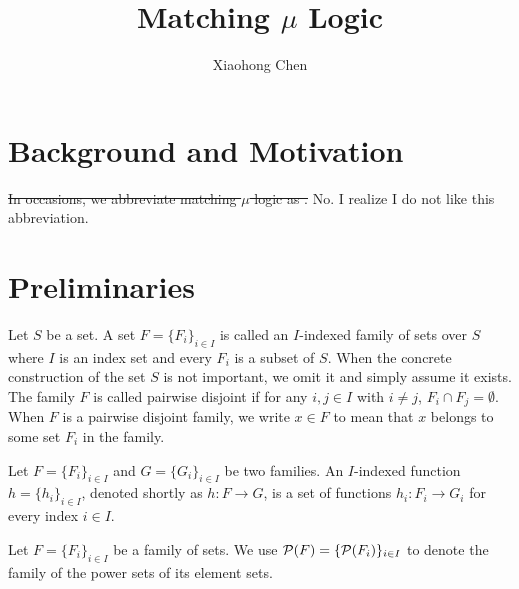\documentclass{amsart}
\title{Matching $\mu$ Logic}
\author{Xiaohong Chen}
\begin{document}
\maketitle


\section{Background and Motivation}
\sout{
In occasions, we abbreviate matching $\mu$ logic as \MmL.
}
No. I realize I do not like this abbreviation. 

\section{Preliminaries}


\begin{definition}
Let $S$ be a set. 
A set $F = \{F_i\}_{i \in I}$ is called an $I$-indexed family of sets
over $S$
where $I$ is an index set and every $F_i                                                                                                                                                                               $ is a subset of $S$.
When the concrete construction of the set $S$ is not important,
we omit it and simply assume it exists.
The family $F$ is called pairwise disjoint if
for any $i, j \in I$ with $i \neq j$, 
$F_i \cap F_j = \emptyset$.
When $F$ is a pairwise disjoint family,
we write $x \in F$ to mean that $x$ belongs to some set $F_i$ in the family. 
\end{definition}

\begin{notation}
Let $F = \{F_i\}_{i \in I}$ and $G = \{G_i\}_{i \in I}$ be two families. 
An $I$-indexed function $h = \{ h_i \}_{i \in I}$,
denoted shortly as $h \colon F \to G$,
is a set of
functions $h_i \colon F_i \to G_i$ for every index $i \in I$.
\end{notation}

\begin{notation}
Let $F = \{F_i\}_{i \in I}$ be a family of sets.
We use $\mathcal{P}(F) = \{ \mathcal{P}(F_i) \}_{i \in I}$ to denote the family of 
the power sets of its element sets.
\end{notation}
\end{document}
